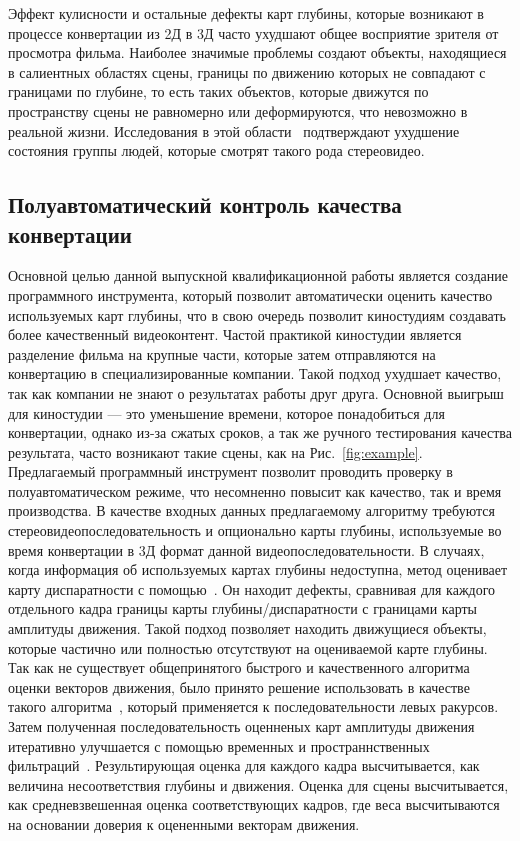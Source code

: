 \documentclass[14pt, a4paper]{extarticle}
\begin{document}
Эффект кулисности и остальные дефекты карт глубины, которые возникают в процессе 
конвертации из 2Д в 3Д часто ухудшают общее восприятие зрителя от просмотра фильма. 
Наиболее значимые проблемы создают объекты, находящиеся в салиентных областях 
сцены, границы по движению которых не совпадают с границами по глубине, то есть 
таких объектов, которые движутся по пространству сцены не равномерно или деформируются, 
что невозможно в реальной жизни. Исследования в этой области~\cite{jung2012visual,li2014visual} 
подтверждают ухудшение состояния группы людей, которые смотрят такого рода стереовидео.

\subsection{Полуавтоматический контроль качества конвертации}



Основной целью данной выпускной квалификационной работы 
является создание программного инструмента, 
который позволит автоматически оценить качество используемых карт глубины,
что в свою очередь позволит киностудиям создавать более качественный видеоконтент. 
Частой практикой киностудии является разделение фильма на крупные части, которые 
затем отправляются на конвертацию в специализированные компании. Такой подход 
ухудшает качество, так как компании не знают о результатах работы друг друга. 
Основной выигрыш для киностудии --- это уменьшение времени, которое понадобиться 
для конвертации, однако из-за сжатых сроков, а так же ручного тестирования 
качества результата, часто возникают такие сцены, как на Рис.~\ref{fig:example}. 
Предлагаемый программный инструмент позволит проводить проверку в полуавтоматическом 
режиме, что несомненно повысит как качество, так и время производства.
В качестве входных данных предлагаемому алгоритму требуются стереовидеопоследовательность 
и опционально карты глубины, используемые во время конвертации в 3Д формат данной 
видеопоследовательности. В случаях, когда информация об используемых картах 
глубины недоступна, метод оценивает карту диспаратности с помощью~\cite{simonyan2008fast,zhang2014100+}. 
Он находит дефекты, сравнивая для каждого отдельного 
кадра границы карты глубины/диспаратности с границами карты 
амплитуды движения. Такой подход позволяет находить движущиеся объекты, которые 
частично или полностью отсутствуют на оцениваемой карте глубины. Так как не существует 
общепринятого быстрого и качественного алгоритма оценки векторов движения, было принято 
решение использовать в качестве такого алгоритма~\cite{simonyan2008fast}, который 
применяется к последовательности левых ракурсов. Затем полученная последовательность 
оценненых карт амплитуды движения итеративно улучшается с помощью временных и 
пространнственных фильтраций~\cite{fecker2007time,matyunin2011temporal,he2013guided}. 
Результирующая оценка для каждого кадра высчитывается, как величина несоответствия 
глубины и движения. Оценка для сцены высчитывается, как средневзвешенная оценка 
соответствующих кадров, где веса высчитываются на основании доверия 
к оцененными векторам движения.
\end{document}
